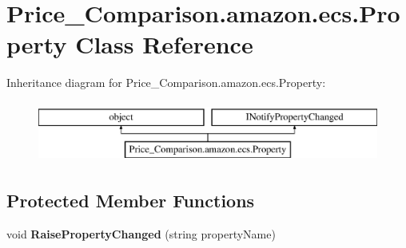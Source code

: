 \hypertarget{class_price___comparison_1_1amazon_1_1ecs_1_1_property}{\section{Price\-\_\-\-Comparison.\-amazon.\-ecs.\-Property Class Reference}
\label{class_price___comparison_1_1amazon_1_1ecs_1_1_property}
}


 


Inheritance diagram for Price\-\_\-\-Comparison.\-amazon.\-ecs.\-Property\-:\begin{figure}[H]
\begin{center}
\leavevmode
\includegraphics[height=2.000000cm]{class_price___comparison_1_1amazon_1_1ecs_1_1_property}
\end{center}
\end{figure}
\subsection*{Protected Member Functions}
\begin{DoxyCompactItemize}
\item 
\hypertarget{class_price___comparison_1_1amazon_1_1ecs_1_1_property_a8b88c0edf4a61c03697310f527154f5b}{void {\bfseries Raise\-Property\-Changed} (string property\-Name)}\label{class_price___comparison_1_1amazon_1_1ecs_1_1_property_a8b88c0edf4a61c03697310f527154f5b}

\end{DoxyCompactItemize}
